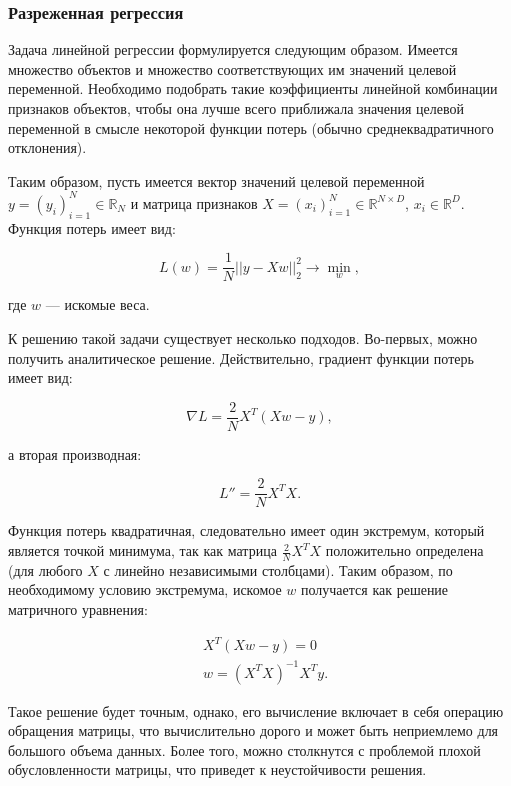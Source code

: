 \subsubsection{Разреженная регрессия}

Задача линейной регрессии формулируется следующим образом. Имеется множество объектов и множество соответствующих им значений целевой переменной. Необходимо подобрать такие коэффициенты линейной комбинации признаков объектов, чтобы она лучше всего приближала значения целевой переменной в смысле некоторой функции потерь (обычно среднеквадратичного отклонения).

Таким образом, пусть имеется вектор значений целевой переменной $y = (y_i)_{i=1}^N \in \mathbb{R}_N$ и матрица признаков $X = (x_i)_{i=1}^N \in \mathbb{R}^{N \times D}$, $x_i \in \mathbb{R}^D$. Функция потерь имеет вид:

\begin{equation}
L(w) = \frac{1}{N} ||y - X w||^2_2 \longrightarrow \min_w,
\end{equation}

где $w$ --- искомые веса.

К решению такой задачи существует несколько подходов. Во-первых, можно получить аналитическое решение. Действительно, градиент функции потерь имеет вид:

\begin{equation}
\nabla L = \frac{2}{N} X^T (X w - y),
\end{equation}

а вторая производная:

\begin{equation}
L'' = \frac{2}{N} X^T X.
\end{equation}

Функция потерь квадратичная, следовательно имеет один экстремум, который является точкой минимума, так как матрица $\frac{2}{N} X^T X$ положительно определена (для любого $X$ с линейно независимыми столбцами). Таким образом, по необходимому условию экстремума, искомое $w$ получается как решение матричного уравнения:

\begin{align}
&X^T (X w - y) = 0 \\
&w = (X^T X)^{-1} X^T y.
\end{align}

Такое решение будет точным, однако, его вычисление включает в себя операцию обращения матрицы, что вычислительно дорого и может быть неприемлемо для большого объема данных. Более того, можно столкнутся с проблемой плохой обусловленности матрицы, что приведет к неустойчивости решения.

